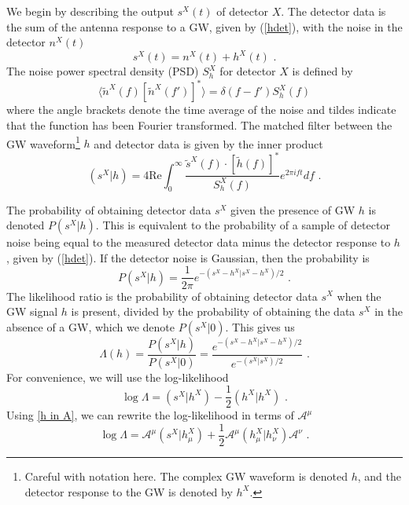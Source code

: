 \documentclass[11pt]{cuthesis}
\newcommand{\fs}{\text{ .}}
\begin{document}
We begin by describing the output $s^X(t)$ of detector $X$. The detector data is the sum of the antenna response to a GW, given by (\ref{hdet}), with the noise in the detector $n^X(t)$
\begin{equation}
s^X(t) = n^X(t) + h^X(t) \fs
\end{equation}
The noise power spectral density (PSD) $S^X_h$ for detector $X$ is defined by
\begin{equation} \label{pygrb psd}
\langle \tilde{n}^X(f) [\tilde{n}^X(f')]^* \rangle = \delta (f-f') S^X_h(f)
\end{equation} 
where the angle brackets denote the time average of the noise and tildes indicate that the function has been Fourier transformed. The matched filter between the GW waveform\footnote{Careful with notation here. The complex GW waveform is denoted $h$, and the detector response to the GW is denoted by $h^X$.} $h$ and detector data is given by the inner product 
\begin{equation}
(s^X|h) = 4 \text{Re} \int^\infty_0 \frac{\tilde{s}^X(f) \cdot [\tilde{h}(f)]^*}{S^X_h (f)} e^{2\pi i ft}df \fs
\end{equation}

The probability of obtaining detector data $s^X$ given the presence of GW $h$ is denoted $P(s^X|h)$. This is equivalent to the probability of a sample of detector noise being equal to the measured detector data minus the detector response to $h$, given by (\ref{hdet}). If the detector noise is Gaussian, then the probability is
\begin{equation} \label{prob eqn}
P(s^X|h) = \frac{1}{2\pi}  e^{-(s^X-h^X|s^X-h^X)/2} \fs
\end{equation}
The likelihood ratio is the probability of obtaining detector data $s^X$ when the GW signal $h$ is present, divided by the probability of obtaining the data $s^X$ in the absence of a GW, which we denote $P(s^X|0)$. This gives us
\begin{equation}
\Lambda (h) = \frac{P(s^X|h)}{P(s^X|0)} = \frac{e^{-(s^X-h^X|s^X-h^X)/2}}{e^{-(s^X|s^X)/2}} \fs
\end{equation}
For convenience, we will use the log-likelihood 
\begin{equation}
\log \Lambda = (s^X|h^X) - \frac{1}{2}(h^X|h^X) \fs
\end{equation}
Using \ref{h in A}, we can rewrite the log-likelihood in terms of $\mathcal{A}^\mu$
\begin{equation}
\log \Lambda = \mathcal{A}^\mu(s^X|h^X_\mu) + \frac{1}{2} \mathcal{A}^\mu (h^X_\mu | h^X_\nu) \mathcal{A}^\nu \fs
\end{equation}
\end{document}
